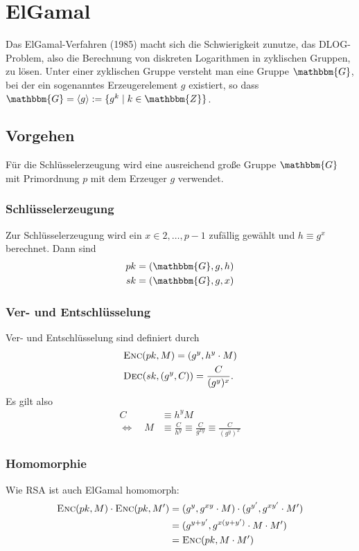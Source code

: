 \section{ElGamal}
\label{ch:asymenc:elgamal} Das ElGamal-Verfahren (1985) macht sich die
Schwierigkeit zunutze, das DLOG-Problem, also die Berechnung von
diskreten Logarithmen in zyklischen Gruppen, zu lösen. Unter einer
zyklischen Gruppe versteht man eine Gruppe $\mathbbm{G}$, bei der ein
sogenanntes Erzeugerelement $g$ existiert, so dass $\mathbbm{G} =
\langle g \rangle := \{g^k \mid k \in \mathbbm{Z}\}$.

\subsection{Vorgehen} 
Für die Schlüsselerzeugung wird eine ausreichend große Gruppe
$\mathbbm{G}$ mit Primordnung $p$ mit dem Erzeuger $g$ verwendet. 
\subsubsection{Schlüsselerzeugung}
Zur Schlüsselerzeugung wird ein $x \in {2,\dots, p-1}$ zufällig gewählt
und $h \equiv g^x$ berechnet. Dann sind
\begin{align*}
pk &= (\mathbbm{G}, g, h)\\ 
sk &= (\mathbbm{G}, g, x)
\end{align*}

\subsubsection{Ver- und Entschlüsselung}
Ver- und Entschlüsselung sind definiert durch
\begin{align*} 
&\textsc{Enc}(pk, M) = (g^y, h^y \cdot M) \\ 
&\textsc{Dec}(sk, (g^y, C))
= \frac{C}{(g^y)^x}.
\end{align*}
Es gilt also 
\begin{align*}
  C &\equiv h^y M \\
 \Leftrightarrow \quad M& \equiv \frac{C}{h^y} \equiv \frac{C}{g^{xy}} \equiv \frac{C}{(g^y)^x}
\end{align*}

\subsubsection{Homomorphie}
Wie RSA ist auch ElGamal homomorph:
\begin{align*} 
\textsc{Enc}({pk,M}) \cdot \textsc{Enc}({pk,M'}) &= (g^y, g^{xy} \cdot M) \cdot (g^{y'},
                                   g^{xy'} \cdot M')\\ 
                                 &= (g^{y+y'}, g^{x(y + y')} \cdot M
                                   \cdot M')\\ 
                                 &= \textsc{Enc}({pk, M \cdot M'})
\end{align*}

